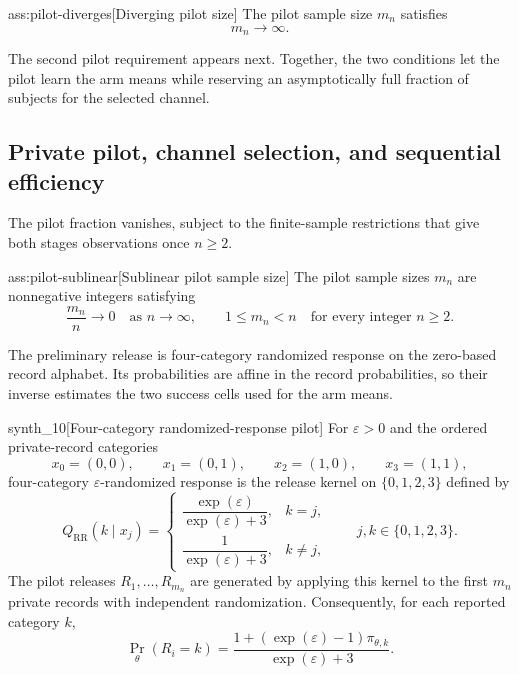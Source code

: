 \begin{assumptionv}{ass:pilot-diverges}[Diverging pilot size]
The pilot sample size \(m_n\) satisfies
\[
m_n\to\infty.
\]
\end{assumptionv}

The second pilot requirement appears next. Together, the two conditions let the pilot learn the arm means while reserving an asymptotically full fraction of subjects for the selected channel.

\subsection{Private pilot, channel selection, and sequential efficiency}

The pilot fraction vanishes, subject to the finite-sample restrictions that give both stages observations once \(n\ge2\).

\begin{assumptionv}{ass:pilot-sublinear}[Sublinear pilot sample size]
The pilot sample sizes \(m_n\) are nonnegative integers satisfying
\[
\frac{m_n}{n}\longrightarrow 0
\quad\text{as }n\to\infty,
\qquad
1\le m_n<n
\quad\text{for every integer }n\ge2.
\]
\end{assumptionv}

The preliminary release is four-category randomized response on the zero-based record alphabet. Its probabilities are affine in the record probabilities, so their inverse estimates the two success cells used for the arm means.

\begin{definitionv}{synth_10}[Four-category randomized-response pilot]
For \(\varepsilon>0\) and the ordered private-record categories
\[
x_0=(0,0),\qquad x_1=(0,1),\qquad
x_2=(1,0),\qquad x_3=(1,1),
\]
four-category \(\varepsilon\)-randomized response is the release kernel on \(\{0,1,2,3\}\) defined by
\[
Q_{\mathrm{RR}}(k\mid x_j)
=
\begin{cases}
\dfrac{\exp(\varepsilon)}{\exp(\varepsilon)+3},&k=j,\\[6pt]
\dfrac{1}{\exp(\varepsilon)+3},&k\ne j,
\end{cases}
\qquad j,k\in\{0,1,2,3\}.
\]
The pilot releases \(R_1,\ldots,R_{m_n}\) are generated by applying this kernel to the first \(m_n\) private records with independent randomization. Consequently, for each reported category \(k\),
\[
\Pr_\theta(R_i=k)
=\frac{1+(\exp(\varepsilon)-1)\pi_{\theta,k}}
       {\exp(\varepsilon)+3}.
\]
\end{definitionv}

